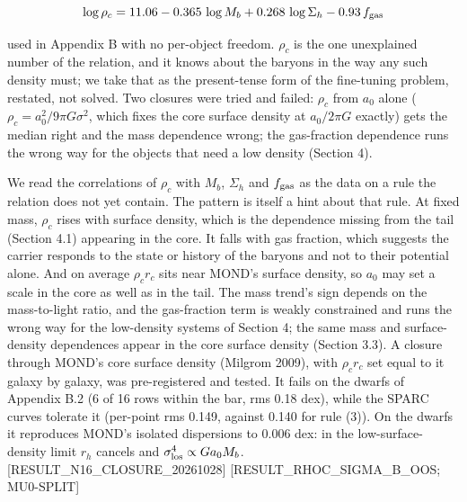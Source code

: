 \documentclass[
  10pt,
]{article}
\begin{document}
\begin{equation}
\log\rho_c = 11.06 - 0.365\,\log M_b + 0.268\,\log\Sigma_h - 0.93\,f_{\rm gas}
\end{equation}

used in Appendix B with no per-object freedom. $\rho_c$ is the one unexplained number of the relation, and it knows about the baryons in the way any such density must; we take that as the present-tense form of the fine-tuning problem, restated, not solved. Two closures were tried and failed: $\rho_c$ from $a_0$ alone ($\rho_c=a_0^2/9\pi G\sigma^2$, which fixes the core surface density at $a_0/2\pi G$ exactly) gets the median right and the mass dependence wrong; the gas-fraction dependence runs the wrong way for the objects that need a low density (Section 4).

We read the correlations of $\rho_c$ with $M_b$, $\Sigma_h$ and $f_{\rm gas}$ as the data on a rule the relation does not yet contain. The pattern is itself a hint about that rule. At fixed mass, $\rho_c$ rises with surface density, which is the dependence missing from the tail (Section 4.1) appearing in the core. It falls with gas fraction, which suggests the carrier responds to the state or history of the baryons and not to their potential alone. And on average $\rho_c r_c$ sits near MOND's surface density, so $a_0$ may set a scale in the core as well as in the tail. The mass trend's sign depends on the mass-to-light ratio, and the gas-fraction term is weakly constrained and runs the wrong way for the low-density systems of Section 4; the same mass and surface-density dependences appear in the core surface density (Section 3.3). A closure through MOND's core surface density (Milgrom 2009), with $\rho_c r_c$ set equal to it galaxy by galaxy, was pre-registered and tested. It fails on the dwarfs of Appendix B.2 (6 of 16 rows within the bar, rms 0.18 dex), while the SPARC curves tolerate it (per-point rms 0.149, against 0.140 for rule (3)). On the dwarfs it reproduces MOND's isolated dispersions to 0.006 dex: in the low-surface-density limit $r_h$ cancels and $\sigma_{\rm los}^4 \propto G a_0 M_b$. {[}RESULT\_N16\_CLOSURE\_20261028{]} {[}RESULT\_RHOC\_SIGMA\_B\_OOS; MU0-SPLIT{]}
\end{document}
